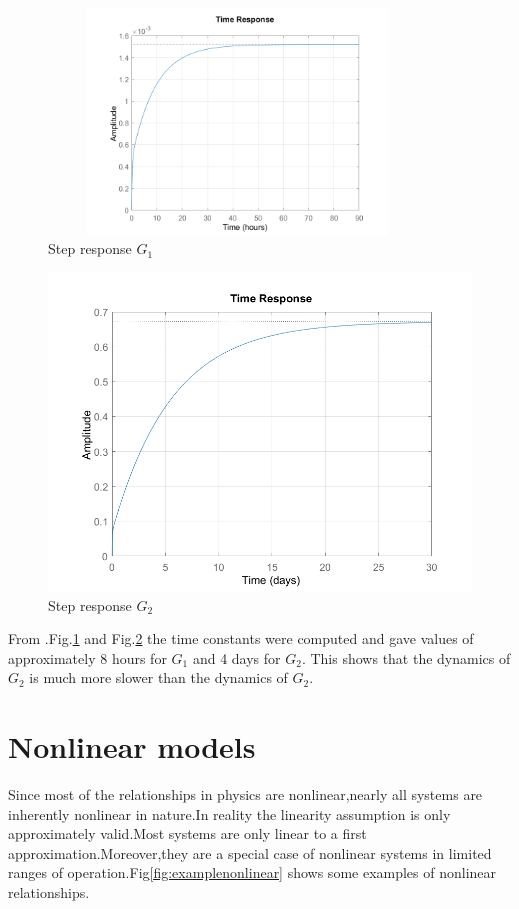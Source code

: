 \documentclass[a4paper,12pt]{report}
\numberwithin{equation}{section}
\begin{document}
\begin{figure}[H]
    \includegraphics[width=10cm, height=6cm]{stepheater.png}
    \centering
    \caption{Step response $G_{1}$ }
    \label{fig:stepheater}
\end{figure}

\begin{figure}[H]
    \includegraphics[scale=0.5]{stepdry.png}
    \centering
    \caption{Step response $G_{2}$}
    \label{fig:stepDrybulb}
\end{figure}

From .Fig.\ref{fig:stepheater} and Fig.\ref{fig:stepDrybulb} the time constants were computed and gave values of approximately 8 hours for  $G_{1}$ and 4 days for $G_{2}$. This shows that the dynamics of $G_{2}$ is much more slower than the dynamics of $G_{2}$.


\section{Nonlinear models}
Since most of the relationships in physics are nonlinear,nearly all systems are inherently nonlinear in nature.In reality the linearity assumption is only approximately valid.Most systems are only linear to a first approximation.Moreover,they are a special case of nonlinear systems in limited ranges of operation.Fig\ref{fig:examplenonlinear} shows some examples of nonlinear relationships.
\end{document}
